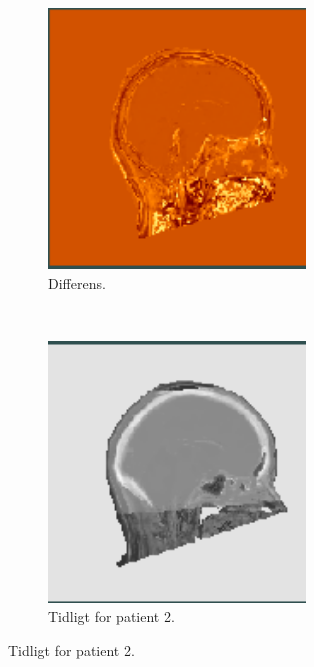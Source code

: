 \begin{figure}[H]
    \begin{subfigure}{0.3\textwidth}
        \centering
        \includegraphics[width=0.75\textwidth]{colager/over_tid_sct/over_tid_sct_121280_sub.png}
        \caption{Differens.}
        \label{col:over_time_sct_pat1_sub}
    \end{subfigure}\\
    \begin{subfigure}{0.3\textwidth}
        \centering
        \includegraphics[width=0.75\textwidth]{colager/over_tid_sct/over_tid_sct_140547_early.png}
        \caption{Tidligt for patient 2.}
        \label{col:over_time_sct_pat2_early}
    \end{subfigure}\hfill

\end{figure}
